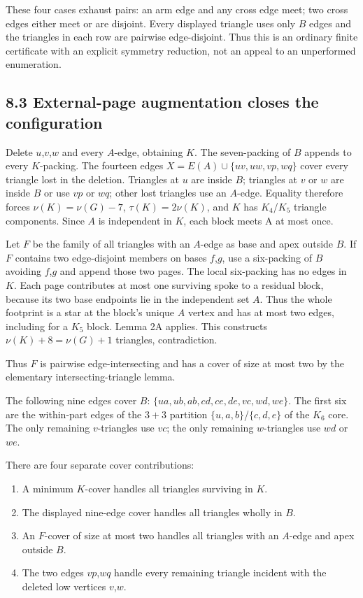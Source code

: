 \documentclass[11pt]{article}
\providecommand{\tightlist}{\setlength{\itemsep}{0pt}\setlength{\parskip}{0pt}}
\begin{document}
These four cases exhaust pairs: an arm edge and any cross edge meet; two
cross edges either meet or are disjoint. Every displayed triangle uses
only \(B\) edges and the triangles in each row are pairwise
edge-disjoint. Thus this is an ordinary finite certificate with an
explicit symmetry reduction, not an appeal to an unperformed
enumeration.

\subsection{8.3 External-page augmentation closes the
configuration}\label{external-page-augmentation-closes-the-configuration}

Delete \(u\),\(v\),\(w\) and every \(A\)-edge, obtaining \(K\). The
seven-packing of \(B\) appends to every \(K\)-packing. The fourteen
edges \(X=E(A)\cup \{uv,uw,vp,wq\}\) cover every triangle lost in the
deletion. Triangles at \(u\) are inside \(B\); triangles at \(v\) or
\(w\) are inside \(B\) or use \(vp\) or \(wq\); other lost triangles use
an \(A\)-edge. Equality therefore forces \(\nu(K)=\nu(G)-7\),
\(\tau(K)=2\nu(K)\), and \(K\) has \(K_4\)/\(K_5\) triangle components.
Since \(A\) is independent in \(K\), each block meets A at most once.

Let \(F\) be the family of all triangles with an \(A\)-edge as base and
apex outside \(B\). If \(F\) contains two edge-disjoint members on bases
\(f\),\(g\), use a six-packing of \(B\) avoiding \(f\),\(g\) and append
those two pages. The local six-packing has no edges in \(K\). Each page
contributes at most one surviving spoke to a residual block, because its
two base endpoints lie in the independent set \(A\). Thus the whole
footprint is a star at the block's unique \(A\) vertex and has at most
two edges, including for a \(K_5\) block. Lemma 2A applies. This
constructs \(\nu(K)+8=\nu(G)+1\) triangles, contradiction.

Thus \(F\) is pairwise edge-intersecting and has a cover of size at most
two by the elementary intersecting-triangle lemma.

The following nine edges cover \(B\):
\(\{ua,ub,ab,cd,ce,de,vc,wd,we\}\). The first six are the within-part
edges of the \(3+3\) partition \(\{u,a,b\}\)/\(\{c,d,e\}\) of the
\(K_6\) core. The only remaining \(v\)-triangles use \(vc\); the only
remaining \(w\)-triangles use \(wd\) or \(we\).

There are four separate cover contributions:

\begin{enumerate}
\def\labelenumi{\arabic{enumi}.}
\tightlist
\item
  A minimum \(K\)-cover handles all triangles surviving in \(K\).
\item
  The displayed nine-edge cover handles all triangles wholly in \(B\).
\item
  An \(F\)-cover of size at most two handles all triangles with an
  \(A\)-edge and apex outside \(B\).
\item
  The two edges \(vp\),\(wq\) handle every remaining triangle incident
  with the deleted low vertices \(v\),\(w\).
\end{enumerate}
\end{document}
